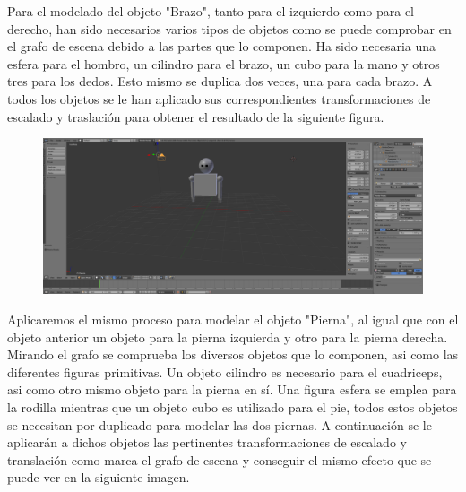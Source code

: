\documentclass[10pt]{article}
\begin{document}
Para el modelado del objeto "Brazo", tanto para el izquierdo como para el derecho, han sido necesarios varios tipos de objetos como se puede comprobar en el grafo de escena debido a las partes que lo componen. Ha sido necesaria una esfera para el hombro, un cilindro para el brazo, un cubo para la mano y otros tres para los dedos. Esto mismo se duplica dos veces, una para cada brazo. A todos los objetos se le han aplicado sus correspondientes transformaciones de escalado y traslación para obtener el resultado de la siguiente figura.\\

\begin{figure}[H]
	\begin{center}
	 		\includegraphics[width = 1.00\textwidth]{Imagenes/p2-img4.png}
	\end{center} 
\end{figure}

Aplicaremos el mismo proceso para modelar el objeto "Pierna", al igual que con el objeto anterior un objeto para la pierna izquierda y otro para la pierna derecha. Mirando el grafo se comprueba los diversos objetos que lo componen, asi como las diferentes figuras primitivas. Un objeto cilindro es necesario para el cuadriceps, asi como otro mismo objeto para la pierna en sí. Una figura esfera se emplea para la rodilla mientras que un objeto cubo es utilizado para el pie, todos estos objetos se necesitan por duplicado para modelar las dos piernas. A continuación se le aplicarán a dichos objetos las pertinentes transformaciones de escalado y translación como marca el grafo de escena y conseguir el mismo efecto que se puede ver en la siguiente imagen. \\ \\ \\ \\ \\
\end{document}
